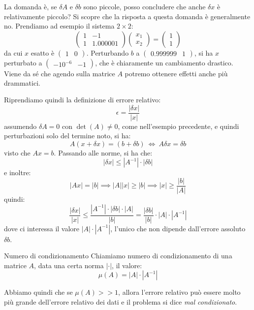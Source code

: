 \documentclass[a4paper,11pt]{article}
\begin{document}
La domanda è, se $\delta A$ e $\delta b$ sono piccole, posso concludere che anche $\delta x$ è relativamente piccolo?
Si scopre che la risposta a questa domanda è generalmente no.
Prendiamo ad esempio il sistema $2 \times 2$:
$$
\begin{pmatrix}
	1 & -1 \\
	1 & 1.000001
\end{pmatrix}
\begin{pmatrix}
	x_1 \\ x_2
\end{pmatrix}
=
\begin{pmatrix}
	1 \\ 1
\end{pmatrix}
$$
da cui $x$ esatto è $\begin{pmatrix}
	1 & 0
\end{pmatrix}$.
Perturbando $b$ a $\begin{pmatrix}
	0.999999 & 1
\end{pmatrix}$, si ha $x$ perturbato a $\begin{pmatrix}
	-10^{-6} & -1
\end{pmatrix}$, che è chiaramente un cambiamento drastico.
Viene da sé che agendo sulla matrice $A$ potremo ottenere effetti anche più drammatici.

Riprendiamo quindi la definizione di errore relativo:
$$
\epsilon = \frac{|\delta x|}{|x|}
$$
assumendo $\delta A = 0$ con $\det(A) \neq 0$, come nell'esempio precedente, e quindi perturbazioni solo del termine noto, si ha:
$$
A (x + \delta x) = (b + \delta b) \ \Leftrightarrow \ A\delta x = \delta b
$$
visto che $Ax = b$. Passando alle norme, si ha che:
$$
| \delta x | \leq |A^{-1}| \cdot |\delta b|
$$
e inoltre:
$$
|Ax| = |b| \implies |A| |x| \geq |b| \implies |x| \geq \frac{|b|}{|A|}
$$
quindi:
$$
\frac{|\delta x|}{|x|} \leq \frac{|A^{-1}| \cdot |\delta b| \cdot |A|}{|b|} = \frac{|\delta b|}{|b|} \cdot |A| \cdot |A^{-1}|
$$
dove ci interessa il valore $|A| \cdot |A^{-1}|$, l'unico che non dipende dall'errore assoluto $\delta b$.
\begin{definition}{Numero di condizionamento}
	Chiamiamo numero di condizionamento di una matrice $A$, data una certa norma $|\cdot|$, il valore:
	$$
		\mu(A) = |A| \cdot |A^{-1}|
	$$
\end{definition}

Abbiamo quindi che se $\mu(A) >> 1$, allora l'errore relativo può essere molto più grande dell'errore relativo dei dati e il problema si dice \textit{mal condizionato}.
\end{document}

